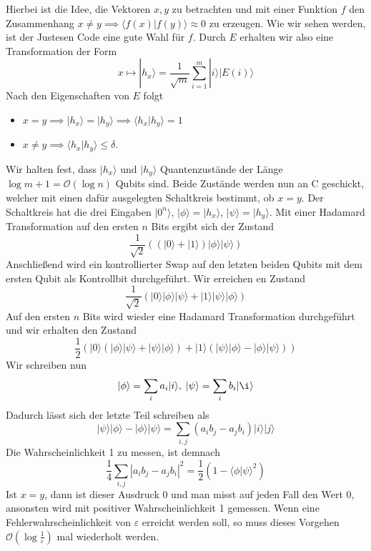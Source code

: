 \documentclass[a4paper, 12pt]{article}
\theoremstyle{plain}
\theoremstyle{definition}
\theoremstyle{lemma}
\theoremstyle{remark}
\theoremstyle{example}
\begin{document}
	Hierbei ist die Idee, die Vektoren $x,y$ zu betrachten und mit einer Funktion $f$ den Zusammenhang $x\neq y \implies \langle f(x)|f(y)\rangle \approx 0$ zu erzeugen. Wie wir sehen werden, ist der Justesen Code eine gute Wahl für $f$. Durch $E$ erhalten wir also eine Transformation der Form \[x \mapsto |h_x\rangle = \frac{1}{\sqrt{m}} \sum_{i=1}^m |i\rangle |E(i)\rangle\] Nach den Eigenschaften von $E$ folgt \begin{itemize}
		\item $x=y\implies |h_x\rangle = |h_y\rangle \implies \langle h_x | h_y \rangle = 1$
		\item $x\neq y \implies \langle h_x |h_y \rangle \leq \delta$.
	\end{itemize}
	Wir halten fest, dass $|h_x\rangle$ und $|h_y\rangle$ Quantenzustände der Länge $\log m +1 = \mathcal{O}(\log n)$ Qubits sind. Beide Zustände werden nun an C geschickt, welcher mit einen dafür ausgelegten Schaltkreis bestimmt, ob $x=y$. Der Schaltkreis hat die drei Eingaben $|0^n\rangle$, $|\phi\rangle = |h_x\rangle$, $|\psi\rangle = |h_y\rangle$. Mit einer Hadamard Transformation auf den ersten $n$ Bits ergibt sich der Zustand \[\frac{1}{\sqrt{2}} ((|0\rangle+|1\rangle)|\phi\rangle|\psi\rangle)\] Anschließend wird ein kontrollierter Swap auf den letzten beiden Qubits mit dem ersten Qubit als Kontrollbit durchgeführt. Wir erreichen en Zustand \[\frac{1}{\sqrt{2}} (|0\rangle|\phi\rangle|\psi\rangle + |1\rangle |\psi\rangle |\phi\rangle)\] Auf den ersten $n$ Bits wird wieder eine Hadamard Transformation durchgeführt und wir erhalten den Zustand \[\frac{1}{2} (|0\rangle(|\phi\rangle|\psi\rangle + |\psi\rangle|\phi\rangle) + |1\rangle (|\psi\rangle |\phi\rangle - |\phi\rangle |\psi\rangle))\] Wir schreiben nun \[|\phi\rangle = \sum_i a_i|i\rangle, \; |\psi\rangle = \sum_i b_i |\i\rangle\] Dadurch lässt sich der letzte Teil schreiben als \[|\psi\rangle |\phi\rangle - |\phi\rangle |\psi\rangle = \sum_{i,j} (a_ib_j - a_jb_i)|i\rangle|j\rangle\] Die Wahrscheinlichkeit 1 zu messen, ist demnach \[\frac{1}{4} \sum_{i,j} \left|a_ib_j - a_jb_i\right|^2 = \frac{1}{2} (1-\langle\phi|\psi\rangle^2)\] Ist $x=y$, dann ist dieser Ausdruck 0 und man misst auf jeden Fall den Wert 0, ansonsten wird mit positiver Wahrscheinlichkeit 1 gemessen. Wenn eine Fehlerwahrscheinlichkeit von $\varepsilon$ erreicht werden soll, so muss dieses Vorgehen $\mathcal{O}(\log \frac{1}{\varepsilon})$ mal wiederholt werden.
\end{document}
